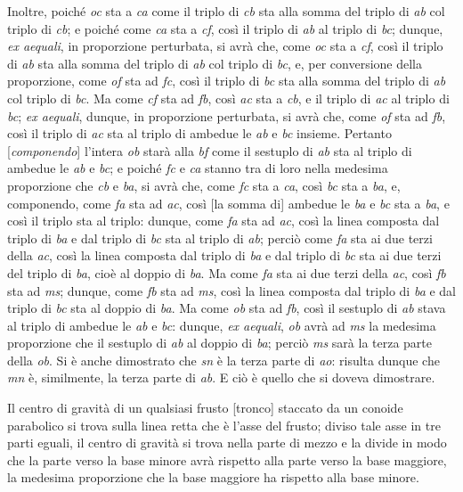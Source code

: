 \documentclass[11pt,twoside,openany]{book}
\begin{document}
Inoltre, poiché \emph{oc} sta a \emph{ca} come il triplo di \emph{cb} sta alla somma del triplo di \emph{ab} col triplo di \emph{cb}; e poiché come \emph{ca} sta a \emph{cf}, così il triplo di \emph{ab} al triplo di \emph{bc}; dunque, \emph{ex aequali}, in proporzione perturbata, si avrà che, come \emph{oc} sta a \emph{cf}, così il triplo di \emph{ab} sta alla somma del triplo di \emph{ab} col triplo di \emph{bc}, e, per conversione della proporzione, come \emph{of} sta ad \emph{fc}, così il triplo di \emph{bc} sta alla somma del triplo di \emph{ab} col triplo di \emph{bc}. Ma come \emph{cf} sta ad \emph{fb}, così \emph{ac} sta a \emph{cb}, e il triplo di \emph{ac} al triplo di \emph{bc}; \emph{ex aequali}, dunque, in proporzione perturbata, si avrà che, come \emph{of} sta ad \emph{fb}, così il triplo di \emph{ac} sta al triplo di ambedue le \emph{ab} e \emph{bc} insieme. Pertanto [\emph{componendo}] l'intera \emph{ob} starà alla \emph{bf} come il sestuplo di \emph{ab} sta al triplo di ambedue le \emph{ab} e \emph{bc}; e poiché \emph{fc} e \emph{ca} stanno tra di loro nella medesima proporzione che \emph{cb} e \emph{ba}, si avrà che, come \emph{fc} sta a \emph{ca}, così \emph{bc} sta a \emph{ba}, e, componendo, come \emph{fa} sta ad \emph{ac}, così [la somma di] ambedue le \emph{ba} e \emph{bc} sta a \emph{ba}, e così il triplo sta al triplo: dunque, come \emph{fa} sta ad \emph{ac}, così la linea composta dal triplo di \emph{ba} e dal triplo di \emph{bc} sta al triplo di \emph{ab}; perciò come \emph{fa} sta ai due terzi della \emph{ac}, così la linea composta dal triplo di \emph{ba} e dal triplo di \emph{bc} sta ai due terzi del triplo di \emph{ba}, cioè al doppio di \emph{ba}. Ma come \emph{fa} sta ai due terzi della \emph{ac}, così \emph{fb} sta ad \emph{ms}; dunque, come \emph{fb} sta ad \emph{ms}, così la linea composta dal triplo di \emph{ba} e dal triplo di \emph{bc} sta al doppio di \emph{ba}. Ma come \emph{ob} sta ad \emph{fb}, così il sestuplo di \emph{ab} stava al triplo di ambedue le \emph{ab} e \emph{bc}: dunque, \emph{ex aequali}, \emph{ob} avrà ad \emph{ms} la medesima proporzione che il sestuplo di \emph{ab} al doppio di \emph{ba}; perciò \emph{ms} sarà la terza parte della \emph{ob}. Si è anche dimostrato che \emph{sn} è la terza parte di \emph{ao}: risulta dunque che \emph{mn} è, similmente, la terza parte di \emph{ab}. E ciò è quello che si doveva dimostrare.

Il centro di gravità di un qualsiasi frusto [tronco] staccato da un conoide parabolico si trova sulla linea retta che è l'asse del frusto; diviso tale asse in tre parti eguali, il centro di gravità si trova nella parte di mezzo e la divide in modo che la parte verso la base minore avrà rispetto alla parte verso la base maggiore, la medesima proporzione che la base maggiore ha rispetto alla base minore.
\end{document}
